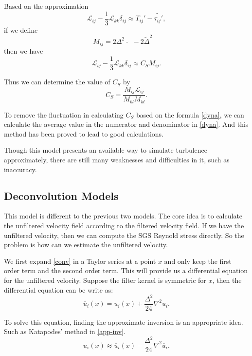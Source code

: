 \documentclass[english, nochinese]{pkupaper}
\begin{document}
\par Based on the approximation
\begin{equation}
	\mathcal{L}_{ij} - \frac{1}{3}\mathcal{L}_{kk}\delta_{ij}\approx T_{ij}' - \widetilde{\tau_{ij}'},
\end{equation}
if we define
\begin{equation}
	M_{ij} = 2\Delta^2\widetilde{\mathop{\overline{S}}\mathop{\overline{S}_{ij}}} - 2\widetilde{\Delta}^2\mathop{\widetilde{\overline{S}}}\mathop{\widetilde{\overline{S}}_{ij}}
\end{equation}
then we have
\begin{equation}
	\mathcal{L}_{ij} - \frac{1}{3}\mathcal{L}_{kk}\delta_{ij} \approx C_S M_{ij}.
\end{equation}
\par Thus we can determine the value of $C_S$ by
\begin{equation}\label{dyna}
	C_S = \frac{M_{ij}\mathcal{L}_{ij}}{M_{kl}M_{kl}}.
\end{equation}
\par To remove the fluctuation in calculating $C_S$ based on the formula \eqref{dyna}, we can calculate the average value in the numerator and denominator in \eqref{dyna}. And this method has been proved to lead to good calculations.
\par Though this model presents an available way to simulate turbulence approximately, there are still many weaknesses and difficulties in it, such as inaccuracy.

\subsection{Deconvolution Models}
\par This model is different to the previous two models. The core idea is to calculate the unfiltered velocity field according to the filtered velocity field. If we have the unfiltered velocity, then we can compute the SGS Reynold stress directly. So the problem is how can we estimate the unfiltered velocity.
\par We first expand \eqref{conv} in a Taylor series at a point $x$ and only keep the first order term and the second order term. This will provide us a differential equation for the unfiltered velocity. Suppose the filter kernel is symmetric for $x$, then the differential equation can be write as:
\begin{equation}
	\overline{u}_i(x) = u_i(x) + \frac{\Delta^2}{24}\nabla^2u_i.
\end{equation}
\par To solve this equation, finding the approximate inversion is an appropriate idea. Such as Katapodes' method in \eqref{app-inv}.
\begin{equation}\label{app-inv}
	u_i(x)\approx \overline{u}_i(x) - \frac{\Delta^2}{24}\nabla^2\overline{u}_i.
\end{equation}
\end{document}
